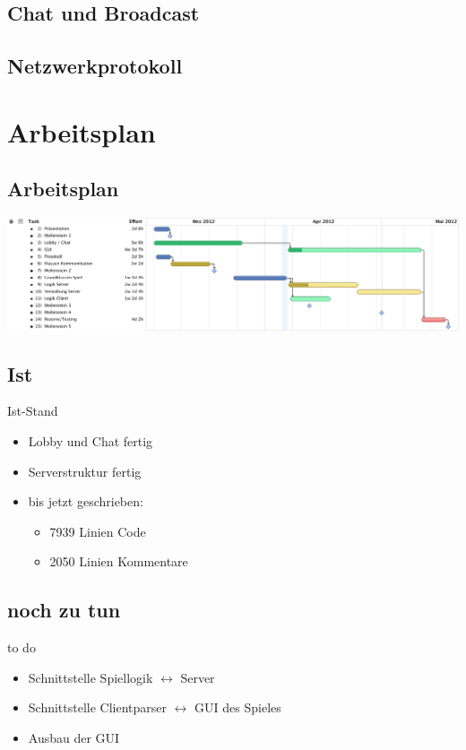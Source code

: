\documentclass[12pt, utf8]{beamer}
\begin{document}
\subsection{Chat und Broadcast}
\begin{frame}

\end{frame}
\subsection{Netzwerkprotokoll}
\begin{frame}

\end{frame}

\section{Arbeitsplan}
\subsection{Arbeitsplan}
\begin{frame}
\centering
\includegraphics[scale=0.3]{images/CS108.pdf}
\end{frame}

\subsection{Ist}
\begin{frame}{Ist-Stand}
\begin{itemize}
\item Lobby und Chat fertig
\item Serverstruktur fertig %
\item bis jetzt geschrieben:
\begin{itemize}
\item 7939 Linien Code
\item 2050 Linien Kommentare
\end{itemize}

\end{itemize}
\end{frame}

\subsection{noch zu tun}
\begin{frame}{to do}
\begin{itemize}
\item Schnittstelle Spiellogik $\leftrightarrow$ Server
\item Schnittstelle Clientparser $\leftrightarrow$ GUI des Spieles
\item Ausbau der GUI
\end{itemize}
\end{frame}
\end{document}
